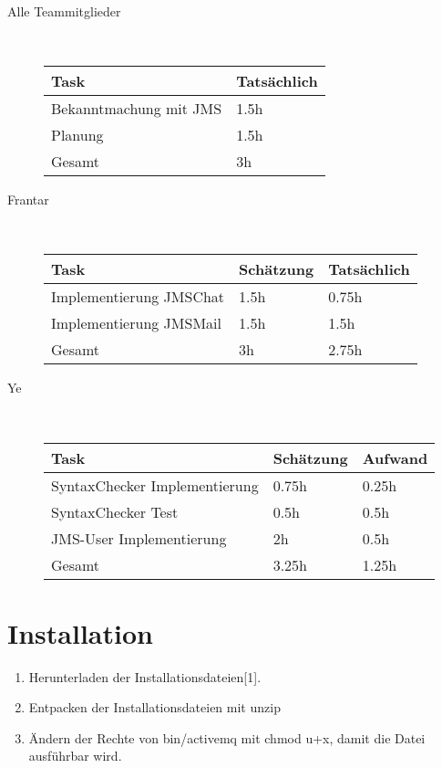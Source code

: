 \documentclass[11pt, a4paper]{article}
\begin{document}
\begin{description}
\item[Alle Teammitglieder] \hfill \\

  \begin{tabular} {| l | l |}
    \hline
    Task & Tatsächlich \\ \hline
    Bekanntmachung mit JMS & 1.5h \\ \hline
    Planung & 1.5h \\ \hline
    \hline
    Gesamt & 3h \\ \hline
  \end{tabular}

\item[Frantar] \hfill \\

  \begin{tabular} {| l | l | l |}
    \hline
    Task & Schätzung & Tatsächlich \\ \hline
    Implementierung JMSChat & 1.5h & 0.75h \\ \hline
    Implementierung JMSMail & 1.5h & 1.5h \\ \hline
    \hline
    Gesamt & 3h & 2.75h \\ \hline
  \end{tabular}

\item[Ye] \hfill \\

    \begin{tabular} {| l | l | l |}
      \hline
      Task & Schätzung & Aufwand \\ \hline
      SyntaxChecker Implementierung & 0.75h & 0.25h \\ \hline
      SyntaxChecker Test & 0.5h & 0.5h \\ \hline
      JMS-User Implementierung & 2h & 0.5h \\ \hline
      \hline
      Gesamt & 3.25h & 1.25h \\ \hline
    \end{tabular}

\end{description}

\section{Installation}
\begin{enumerate}
\item Herunterladen der Installationsdateien[1].
\item Entpacken der Installationsdateien mit unzip
\item Ändern der Rechte von bin/activemq mit chmod u+x, damit die Datei ausführbar wird.
\end{enumerate}
\newpage
\end{document}
